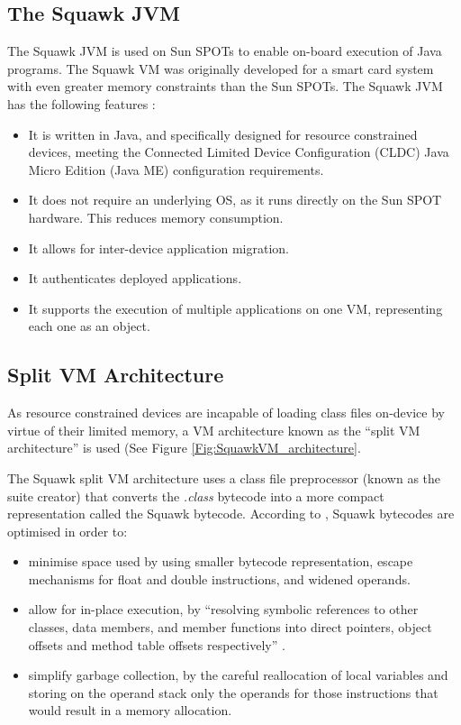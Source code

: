 \subsection{The Squawk JVM}

The Squawk JVM is used on Sun SPOTs to enable on-board execution of Java
programs. The Squawk VM was originally developed for a smart card system with
even greater memory constraints than the Sun SPOTs. The Squawk JVM has the
following features \cite{simon_squawk:2006}:

\begin{itemize}
  \item It is written in Java, and specifically designed for resource
  constrained devices, meeting the Connected Limited Device Configuration
  (CLDC) Java Micro Edition (Java ME) configuration requirements.
  \item It does not require an underlying OS, as it runs directly on the Sun
  SPOT hardware. This reduces memory consumption.
  \item It allows for inter-device application migration.
  \item It authenticates deployed applications.
  \item It supports the execution of multiple applications on one VM,
  representing each one as an object.
\end{itemize}

\subsection{Split VM Architecture}

As resource constrained devices are incapable of loading class files on-device
by virtue of their limited memory, a VM architecture known as the ``split VM
architecture'' is used (See Figure \ref{Fig:SquawkVM_architecture}. 

The Squawk split VM architecture uses a class file preprocessor (known as the
suite creator) that converts the \emph{.class} bytecode into a more compact
representation called the Squawk bytecode. According to
\cite{simon_squawk:2006}, Squawk bytecodes are optimised in order to:
\begin{itemize}
\item minimise space used by using smaller bytecode representation, escape
mechanisms for float and double instructions, and widened operands. 
\item allow for in-place execution, by ``resolving symbolic references to other
classes, data members, and member functions into direct pointers, object offsets
and method table offsets respectively'' \cite{simon_squawk:2006}.
\item simplify garbage collection, by the careful reallocation of local
variables and storing on the operand stack only the operands for those
instructions that would result in a memory allocation.
\end{itemize}

